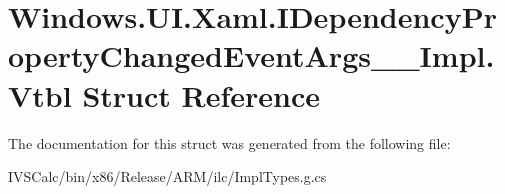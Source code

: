 \hypertarget{struct_windows_1_1_u_i_1_1_xaml_1_1_i_dependency_property_changed_event_args_____impl_1_1_vtbl}{}\section{Windows.\+U\+I.\+Xaml.\+I\+Dependency\+Property\+Changed\+Event\+Args\+\_\+\+\_\+\+Impl.\+Vtbl Struct Reference}
\label{struct_windows_1_1_u_i_1_1_xaml_1_1_i_dependency_property_changed_event_args_____impl_1_1_vtbl}


The documentation for this struct was generated from the following file\+:\begin{DoxyCompactItemize}
\item 
I\+V\+S\+Calc/bin/x86/\+Release/\+A\+R\+M/ilc/Impl\+Types.\+g.\+cs\end{DoxyCompactItemize}
